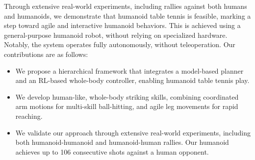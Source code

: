 Through extensive real-world experiments, including rallies against both humans and humanoids, we demonstrate that humanoid table tennis is feasible, marking a step toward agile and interactive humanoid behaviors. This is achieved using a general-purpose humanoid robot, without relying on specialized hardware. Notably, the system operates fully autonomously, without teleoperation. Our contributions are as follows:
\begin{itemize}
    \item We propose a hierarchical framework that integrates a model-based planner and an RL-based whole-body controller, enabling humanoid table tennis play.
    \item We develop human-like, whole-body striking skills, combining coordinated arm motions for multi-skill ball-hitting, and agile leg movements for rapid reaching.
    \item We validate our approach through extensive real-world experiments, including both humanoid-humanoid and humanoid-human rallies. Our humanoid achieves up to 106 consecutive shots against a human opponent.
\end{itemize}

